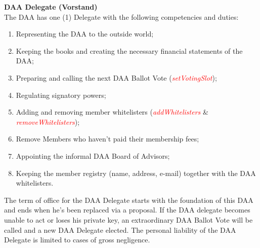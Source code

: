 \item \textbf{DAA Delegate (Vorstand)} \\
The DAA has one (1) Delegate with the following competencies and duties:
\begin{enumerate}
    [label=(\alph*)]
    \item Representing the DAA to the outside world;
    \item Keeping the books and creating the necessary financial statements of the DAA;
    \item Preparing and calling the next DAA Ballot Vote (\textcolor{red}{\emph{setVotingSlot}});
    \item Regulating signatory powers;
    \item Adding and removing member whitelisters (\textcolor{red}{\emph{addWhitelisters}} \& \textcolor{red}{\emph{removeWhitelisters}});
    \item Remove Members who haven't paid their membership fees;
    \item Appointing the informal DAA Board of Advisors; %
    \item Keeping the member registry (name, address, e-mail) together with the DAA whitelisters. %
\end{enumerate}
The term of office for the DAA Delegate starts with the foundation of this DAA and ends when he's been replaced via a proposal.
If the DAA delegate becomes unable to act or loses his private key, an extraordinary DAA Ballot Vote will be called and a new DAA Delegate elected.
The personal liability of the DAA Delegate is limited to cases of gross negligence.


